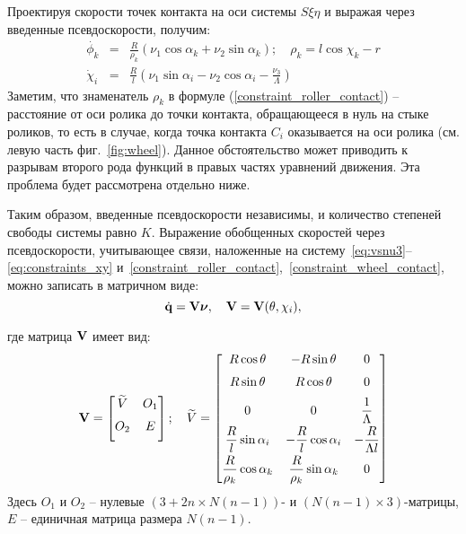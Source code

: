 Проектируя скорости точек контакта на оси системы $S\xi\eta$ и выражая через введенные псевдоскорости, получим:
\begin{eqnarray}
    \dot{\phi_k} &=& \frac{R}{\rho_k }\left(\nu_1\cos\alpha_k + \nu_2\sin\alpha_k\right); \quad \rho_k  = l\cos\chi_k - r \label{constraint_roller_contact} \\
    \dot{\chi}_i &=& \frac{R}{l}\left(\nu_1\sin\alpha_i - \nu_2\cos\alpha_i - \frac{\nu_3}{\Lambda}\right)\label{constraint_wheel_contact}
\end{eqnarray}
Заметим, что знаменатель $\rho_k$ в формуле (\ref{constraint_roller_contact}) -- расстояние от оси ролика до точки контакта, обращающееся в нуль на стыке роликов, то есть в случае, когда точка контакта $C_i$ оказывается на оси ролика (см. левую часть фиг.~\ref{fig:wheel}). Данное обстоятельство может приводить к разрывам второго рода функций в правых частях уравнений движения. Эта проблема будет рассмотрена отдельно ниже.

Таким образом, введенные псевдоскорости независимы, и количество степеней свободы системы равно $K$. Выражение обобщенных скоростей через псевдоскорости, учитывающее связи, наложенные на систему~\eqref{eq:vsnu3}--\eqref{eq:constraints_xy} и~\eqref{constraint_roller_contact},~\eqref{constraint_wheel_contact}, можно записать в матричном виде:
\begin{equation}\label{constraints_V}
    \dot{\boldsymbol{\mathbf{q}}} = \mathbf{V}\boldsymbol{\mathbf{\nu}},\quad \mathbf{V} = \mathbf{V}(\theta,\chi_i),
\end{equation}

где матрица $\mathbf{V}$ имеет вид:
$$
\mathbf{V} = \begin{bmatrix}
        \widetilde{V}  & O_1  \\[6pt]
        O_2       & E         \\[6pt]
    \end{bmatrix};
\quad
\widetilde{V} = \begin{bmatrix}
        R\cos\theta                    & -R\sin\theta                    & 0                      \\[6pt]
        R\sin\theta                    &  R\cos\theta                    & 0                      \\[6pt]
        0                              & 0                               & \displaystyle\frac{\displaystyle 1}{\displaystyle \Lambda}    \\[6pt]
        \displaystyle\frac{\displaystyle R}{\displaystyle l}\sin\alpha_i      & -\displaystyle\frac{\displaystyle R}{\displaystyle l}\cos\alpha_i      & -\displaystyle\frac{\displaystyle R}{\displaystyle \Lambda l} \\[6pt]
        \displaystyle\frac{\displaystyle R}{\displaystyle \rho_k}\cos\alpha_k &  \displaystyle\frac{\displaystyle R}{\displaystyle \rho_k}\sin\alpha_k & 0                      \\[6pt]
    \end{bmatrix}
$$
Здесь $O_1$ и $O_2$ -- нулевые $(3+2n \times N(n-1))$- и $(N(n-1) \times 3)$-матрицы, $E$ -- единичная матрица размера $N(n-1)$.


